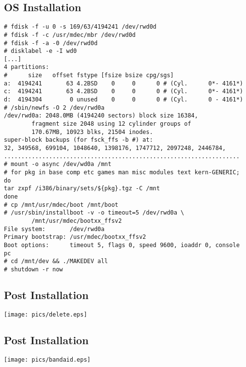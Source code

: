 \documentclass[xga]{xdvislides}
\begin{document}
\subsection{OS Installation}
\small
\begin{verbatim}
# fdisk -f -u 0 -s 169/63/4194241 /dev/rwd0d
# fdisk -f -c /usr/mdec/mbr /dev/rwd0d
# fdisk -f -a -0 /dev/rwd0d
# disklabel -e -I wd0
[...]
4 partitions:
#      size   offset fstype [fsize bsize cpg/sgs]
a:  4194241       63 4.2BSD    0     0      0 # (Cyl.      0*- 4161*)
c:  4194241       63 4.2BSD    0     0      0 # (Cyl.      0*- 4161*)
d:  4194304        0 unused    0     0      0 # (Cyl.      0 - 4161*)
# /sbin/newfs -O 2 /dev/rwd0a
/dev/rwd0a: 2048.0MB (4194240 sectors) block size 16384,
        fragment size 2048 using 12 cylinder groups of
        170.67MB, 10923 blks, 21504 inodes.
super-block backups (for fsck_ffs -b #) at:
32, 349568, 699104, 1048640, 1398176, 1747712, 2097248, 2446784,
....................................................................
# mount -o async /dev/wd0a /mnt
# for pkg in base comp etc games man misc modules text kern-GENERIC; do
tar zxpf /i386/binary/sets/${pkg}.tgz -C /mnt
done
# cp /mnt/usr/mdec/boot /mnt/boot
# /usr/sbin/installboot -v -o timeout=5 /dev/rwd0a \
        /mnt/usr/mdec/bootxx_ffsv2
File system:       /dev/rwd0a
Primary bootstrap: /usr/mdec/bootxx_ffsv2
Boot options:      timeout 5, flags 0, speed 9600, ioaddr 0, console pc
# cd /mnt/dev && ./MAKEDEV all
# shutdown -r now
\end{verbatim}
\Normalsize

\subsection{Post Installation}
\vspace*{\fill}
\begin{center}
	\texttt{[image: pics/delete.eps]}
\end{center}
\vspace*{\fill}

\subsection{Post Installation}
\vspace*{\fill}
\begin{center}
	\texttt{[image: pics/bandaid.eps]}
\end{center}
\vspace*{\fill}
\end{document}
